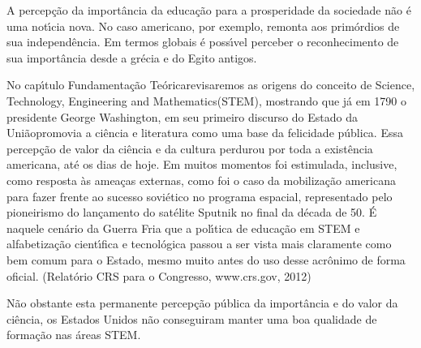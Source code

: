 \documentclass[
12pt,		%
openright,	%
twoside,  %
a4paper,			%
chapter=TITLE,		%
english,			%
french,				%
spanish,			%
brazil				%
]{USPSC-classe/USPSC}
\begin{document}
A percep\c{c}\~ao da import\^ancia da educa\c{c}\~ao para a prosperidade da sociedade n\~ao \'e uma not\'{\i}cia nova. No caso americano, por exemplo, remonta aos prim\'ordios de sua independ\^encia. Em termos globais \'e poss\'{\i}vel perceber o reconhecimento de sua import\^ancia desde a gr\'ecia e do Egito antigos.














No cap\'{\i}tulo \textquotedbl Fundamenta\c{c}\~ao Te\'orica\textquotedbl  revisaremos as origens do conceito de \textquotedbl Science, Technology, Engineering and Mathematics\textquotedbl  (STEM), mostrando que j\'a em 1790 o presidente George Washington, em seu primeiro discurso do \textquotedbl Estado da Uni\~ao\textquotedbl  promovia a ci\^encia e literatura como uma base da \textquotedbl felicidade p\'ublica\textquotedbl  [XXX]. Essa percep\c{c}\~ao de valor da ci\^encia e da cultura perdurou por toda a exist\^encia americana, at\'e os dias de hoje. Em muitos momentos foi estimulada, inclusive, como resposta \`as amea\c{c}as externas, como foi o caso da mobiliza\c{c}\~ao americana para fazer frente ao sucesso sovi\'etico no programa espacial, representado pelo pioneirismo do lan\c{c}amento do sat\'elite Sputnik no final da d\'ecada de 50. \'E naquele cen\'ario da Guerra Fria que a pol\'{\i}tica de educa\c{c}\~ao em STEM e alfabetiza\c{c}\~ao cient\'{\i}fica e tecnol\'ogica passou a ser vista mais claramente como bem comum para o Estado, mesmo muito antes do uso desse acr\^onimo de forma oficial. (Relat\'orio CRS para o Congresso, www.crs.gov, 2012)














N\~ao obstante esta permanente percep\c{c}\~ao p\'ublica da import\^ancia e do valor da ci\^encia, os Estados Unidos n\~ao conseguiram manter uma boa qualidade de forma\c{c}\~ao nas \'areas STEM.
\end{document}
